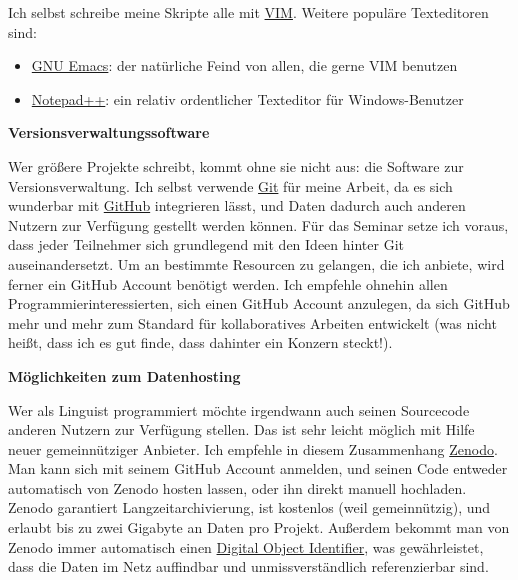 Ich selbst schreibe meine Skripte alle mit \href{http://vim.org}{VIM}.
Weitere populäre Texteditoren sind:

\begin{itemize}
\itemsep1pt\parskip0pt
\item
  \href{https://www.gnu.org/software/emacs/}{GNU Emacs}: der natürliche
  Feind von allen, die gerne VIM benutzen
\item
  \href{http://de.wikipedia.org/wiki/Notepad++}{Notepad++}: ein relativ
  ordentlicher Texteditor für Windows-Benutzer
\end{itemize}



\par\noindent\textbf{Versionsverwaltungssoftware}

Wer größere Projekte schreibt, kommt ohne sie nicht aus: die Software
zur Versionsverwaltung. Ich selbst verwende
\href{http://de.wikipedia.org/wiki/Git}{Git} für meine Arbeit, da es
sich wunderbar mit \href{http://github.org}{GitHub} integrieren lässt,
und Daten dadurch auch anderen Nutzern zur Verfügung gestellt werden
können. Für das Seminar setze ich voraus, dass jeder Teilnehmer sich
grundlegend mit den Ideen hinter Git auseinandersetzt. Um an bestimmte
Resourcen zu gelangen, die ich anbiete, wird ferner ein GitHub Account
benötigt werden. Ich empfehle ohnehin allen Programmierinteressierten,
sich einen GitHub Account anzulegen, da sich GitHub mehr und mehr zum
Standard für kollaboratives Arbeiten entwickelt (was nicht heißt, dass
ich es gut finde, dass dahinter ein Konzern steckt!).



\par\noindent\textbf{Möglichkeiten zum Datenhosting}

Wer als Linguist programmiert möchte irgendwann auch seinen Sourcecode
anderen Nutzern zur Verfügung stellen. Das ist sehr leicht möglich mit
Hilfe neuer gemeinnütziger Anbieter. Ich empfehle in diesem Zusammenhang
\href{http://zenodo.org}{Zenodo}. Man kann sich mit seinem GitHub
Account anmelden, und seinen Code entweder automatisch von Zenodo hosten
lassen, oder ihn direkt manuell hochladen. Zenodo garantiert
Langzeitarchivierung, ist kostenlos (weil gemeinnützig), und erlaubt bis
zu zwei Gigabyte an Daten pro Projekt. Außerdem bekommt man von Zenodo
immer automatisch einen
\href{http://de.wikipedia.org/wiki/Digital_Object_Identifier}{Digital
Object Identifier}, was gewährleistet, dass die Daten im Netz auffindbar
und unmissverständlich referenzierbar sind.


